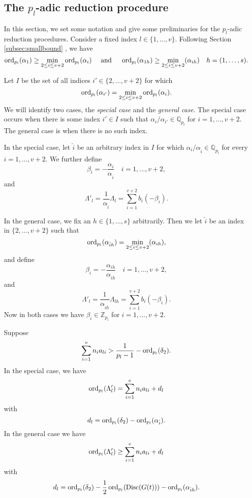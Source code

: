 
\subsection{The $p_l$-adic reduction procedure}

In this section, we set some notation and give some preliminaries for the $p_l$-adic reduction procedures. Consider a fixed index $l \in \{1, \dots, v\}$. Following Section \ref{subsec:smallbound} , we have
\[\operatorname{ord}_{p_l}(\alpha_1) \geq \min_{2\leq i\leq v+2} \operatorname{ord}_{p_l}(\alpha_i) \quad \text{ and } \quad \operatorname{ord}_{p_l}(\alpha_{1h}) \geq \min_{2\leq i\leq v+2}(\alpha_{ih}) \quad h = (1, \dots, s).\]

Let $I$ be the set of all indices $i' \in \{2, \dots, v+2\}$ for which
\[\operatorname{ord}_{p_l}(\alpha_{i'}) = \min_{2\leq i\leq v+2} \operatorname{ord}_{p_l}(\alpha_i).\]
We will identify two cases, the \textit{special case} and the \textit{general case}. The special case occurs when there is some index $i' \in I$ such that $\alpha_i/\alpha_{i'} \in \mathbb{Q}_{p_l}$ for $i = 1, \dots, v+2$. The general case is when there is no such index. 

In the special case, let $\hat{i}$ be an arbitrary index in $I$ for which $\alpha_i/\alpha_{\hat{i}} \in \mathbb{Q}_{p_l}$ for every $i = 1, \dots, v+2$. We further define
\[\beta_i = - \frac{\alpha_i}{\alpha_{\hat{i}}} \quad i = 1, \dots, v+2,\]
and 
\[\Lambda'_l = \frac{1}{\alpha_{\hat{i}}}\Lambda_l = \sum_{i = 1}^{v+2} b_i(-\beta_i).\]

In the general case, we fix an $h \in \{1, \dots, s\}$ arbitrarily. Then we let $\hat{i}$ be an index in $\{2, \dots, v+2\}$ such that 
\[ \operatorname{ord}_{p_l}(\alpha_{\hat{i}h}) = \min_{2\leq i\leq v+2}(\alpha_{ih}),\]
and define
\[\beta_i = - \frac{\alpha_{ih}}{\alpha_{\hat{i}h}} \quad i = 1, \dots, v+2,\]
and 
\[\Lambda'_l = \frac{1}{\alpha_{\hat{i}h}}\Lambda_{lh} = \sum_{i = 1}^{v+2} b_i(-\beta_i).\]
Now in both cases we have $\beta_i \in \mathbb{Z}_{p_l}$ for $i = 1, \dots, v+2$. 

\begin{lemma} \label{Lem:19.1}
Suppose
\[\sum_{i = 1}^v n_{i}a_{li} > \frac{1}{p_l-1} - \operatorname{ord}_{p_l}(\delta_2).\]
In the special case, we have 
\[\operatorname{ord}_{p_l}(\Lambda_l') = \sum_{i = 1}^v n_{i}a_{li} + d_l\]
with
\[d_l = \operatorname{ord}_{p_l}(\delta_2) - \operatorname{ord}_{p_l}(\alpha_{\hat{i}}).\]
In the general case we have
\[\operatorname{ord}_{p_l}(\Lambda_{l}') \geq \sum_{i = 1}^v n_{i}a_{li} + d_l\]
with 
\[d_l = \operatorname{ord}_{p_l}(\delta_2) - \frac{1}{2}\operatorname{ord}_{p_l}(\text{Disc}(G(t))) - \operatorname{ord}_{p_l}(\alpha_{\hat{i}h}).\]
\end{lemma}

